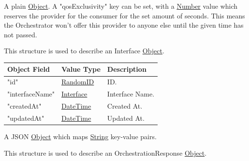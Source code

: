 \documentclass[a4paper]{arrowhead}
\newcommand{\pref}[1]{{\textcolor{ArrowheadGrey}{\hyperref[sec:model:primitives:#1]{#1}}}}
\begin{document}

A plain \pref{Object}. A "qosExclusivity" key can be set, with a \pref{Number} value which reserves the provider for the consumer for the set amount of seconds. This means the Orchestrator won't offer this provider to anyone else until the given time has not passed.



This structure is used to describe an Interface \pref{Object}.

\begin{table}[ht!]
\begin{tabularx}{\textwidth}{| p{5cm} | p{6cm} | X |} \hline
\rowcolor{gray!33} Object Field & Value Type      & Description \\ \hline
"id"                 & \pref{RandomID} & ID. \\ \hline
"interfaceName"      & \pref{Interface}   & Interface Name. \\ \hline
"createdAt"          & \pref{DateTime} & Created At. \\ \hline
"updatedAt"          & \pref{DateTime} & Updated At. \\ \hline

\end{tabularx}
\end{table}


A JSON \pref{Object} which maps \pref{String} key-value pairs.


This structure is used to describe an OrchestrationResponse \pref{Object}. 
\end{document}

